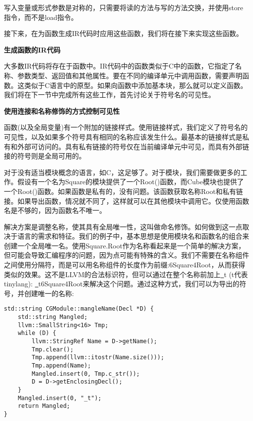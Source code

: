 写入变量或形式参数是对称的，只需要将读的方法与写的方法交换，并使用store指令，而不是load指令。\par

接下来，在为函数生成IR代码时应用这些函数，我们将在接下来实现这些函数。\par

\hspace*{\fill} \par %
\textbf{生成函数的IR代码}

大多数IR代码将存在于函数中。IR代码中的函数类似于C中的函数，它指定了名称、参数类型、返回值和其他属性。要在不同的编译单元中调用函数，需要声明函数。这类似于C语言中的原型。如果向函数中添加基本块，那么就可以定义函数。我们将在下一节中完成所有这些工作，首先讨论关于符号名的可见性。\par

\hspace*{\fill} \par %
\textbf{使用连接和名称修饰的方式控制可见性}

函数(以及全局变量)有一个附加的链接样式。使用链接样式，我们定义了符号名的可见性，以及如果多个符号具有相同的名称应该发生什么。最基本的链接样式是私有和外部可访问的。具有私有链接的符号仅在当前编译单元中可见，而具有外部链接的符号则是全局可用的。\par

对于没有适当模块概念的语言，如C，这足够了。对于模块，我们需要做更多的工作。假设有一个名为Square的模块提供了一个Root()函数，而Cube模块也提供了一个Root()函数。如果函数是私有的，没有问题。该函数获取名称Root和私有链接。如果导出函数，情况就不同了，这样就可以在其他模块中调用它。仅使用函数名是不够的，因为函数名不唯一。\par

解决方案是调整名称，使其具有全局唯一性，这叫做命名修饰。如何做到这一点取决于语言的需求和特征。我们的例子中，基本思想是使用模块名和函数名的组合来创建一个全局唯一名。使用Square.Root作为名称看起来是一个简单的解决方案，但可能会导致汇编程序的问题，因为点可能有特殊的含义。我们不需要在名称组件之间使用分隔符，而是可以用名称组件的长度作为前缀:6Square4Root，从而获得类似的效果。这不是LLVM的合法标识符，但可以通过在整个名称前加上\underline{~}t (t代表tinylang): \underline{~}t6Square4Root来解决这个问题。通过这种方式，我们可以为导出的符号，并创建唯一的名称:\par

\begin{lstlisting}[caption={}]
std::string CGModule::mangleName(Decl *D) {
	std::string Mangled;
	llvm::SmallString<16> Tmp;
	while (D) {
		llvm::StringRef Name = D->getName();
		Tmp.clear();
		Tmp.append(llvm::itostr(Name.size()));
		Tmp.append(Name);
		Mangled.insert(0, Tmp.c_str());
		D = D->getEnclosingDecl();
	}
	Mangled.insert(0, "_t");
	return Mangled;
}
\end{lstlisting}

